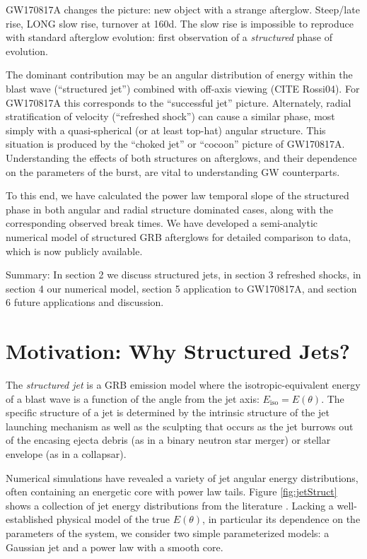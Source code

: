 \documentclass[twocolumn]{aastex62}
\newcommand{\gwbns}{GW170817A}
\newcommand{\Eiso}{\ensuremath{E_{\mathrm{iso}}}}
\begin{document}
\gwbns{} changes the picture: new object with a strange afterglow.  Steep/late rise, LONG slow rise, turnover at 160d.  The slow rise is impossible to reproduce with standard afterglow evolution: first observation of a \emph{structured} phase of evolution. 

The dominant contribution may be an angular distribution of energy within the blast wave (``structured jet'') combined with off-axis viewing (CITE Rossi04).  For \gwbns{} this corresponds to the ``successful jet'' picture.  Alternately, radial stratification of velocity (``refreshed shock'') can cause a similar phase, most simply with a quasi-spherical (or at least top-hat) angular structure.  This situation is produced by the ``choked jet''  or ``cocoon'' picture of \gwbns{}. Understanding the effects of both structures on afterglows, and their dependence on the parameters of the burst, are vital to understanding GW counterparts.

To this end, we have calculated the power law temporal slope of the structured phase in both angular and radial structure dominated cases, along with the corresponding observed break times.  We have developed a semi-analytic numerical model of structured GRB afterglows for detailed comparison to data, which is now publicly available.

Summary: In section 2 we discuss structured jets, in section 3 refreshed shocks, in section 4 our numerical model, section 5 application to \gwbns{}, and section 6 future applications and discussion.

\section{Motivation: Why Structured Jets?}\label{sec:motivation}

The \emph{structured jet} is a GRB emission model where the isotropic-equivalent energy of a blast wave is a function of the angle from the jet axis: $\Eiso = E(\theta)$. The specific structure of a jet is determined by the intrinsic structure of the jet launching mechanism as well as the sculpting that occurs as the jet burrows out of the encasing ejecta debris (as in a binary neutron star merger) or stellar envelope (as in a collapsar).  

Numerical simulations have revealed a variety of jet angular energy distributions, often containing an energetic core with power law tails.  Figure \ref{fig:jetStruct} shows a collection of jet energy distributions from the literature \citep{Aloy:2005aa, Mizuta:2009aa, Duffell:2013aa, Lazzati:2017aa, Margutti:2018aa}.  Lacking a well-established physical model of the true $E(\theta)$, in particular its dependence on the parameters of the system, we consider two simple parameterized models: a Gaussian jet and a power law with a smooth core.  
\end{document}
